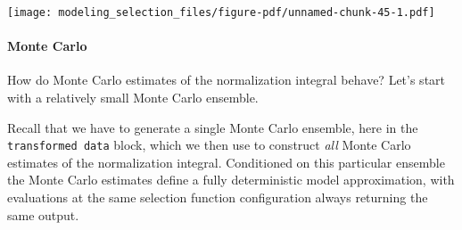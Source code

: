 \documentclass[
  letterpaper,
  DIV=11,
  numbers=noendperiod]{scrartcl}
\let\oldparagraph\paragraph
\renewcommand{\paragraph}[1]{\oldparagraph{#1}\mbox{}}
\begin{document}
\texttt{[image: modeling\_selection\_files/figure-pdf/unnamed-chunk-45-1.pdf]}

\paragraph{Monte Carlo}\label{monte-carlo}

How do Monte Carlo estimates of the normalization integral behave? Let's
start with a relatively small Monte Carlo ensemble.

Recall that we have to generate a single Monte Carlo ensemble, here in
the \texttt{transformed\ data} block, which we then use to construct
\emph{all} Monte Carlo estimates of the normalization integral.
Conditioned on this particular ensemble the Monte Carlo estimates define
a fully deterministic model approximation, with evaluations at the same
selection function configuration always returning the same output.
\end{document}
